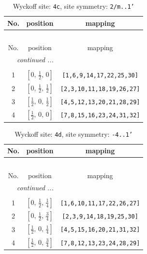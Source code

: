 \documentclass[fleqn,8pt]{jsarticle}
\begin{document}
\renewcommand{\arraystretch}{1.2}
\begin{longtable}{ccc}
\caption{Wyckoff site: {\tt 4c}, site symmetry: {\tt 2/m..1'}}
 \\
 \hline \hline
No. & position & mapping \\ \hline \endfirsthead

\multicolumn{2}{l}{\tablename\ \thetable{}} \\
 \hline \hline
No. & position & mapping \\ \hline \endhead

 \hline \hline
\multicolumn{2}{r}{\footnotesize\it continued ...} \\ \endfoot

 \hline \hline
\multicolumn{2}{r}{} \\ \endlastfoot

1 & $\left[ 0,\, \frac{1}{2},\, 0 \right]$ & {\tt [1,6,9,14,17,22,25,30]} \\ \hline
2 & $\left[ 0,\, \frac{1}{2},\, \frac{1}{2} \right]$ & {\tt [2,3,10,11,18,19,26,27]} \\ \hline
3 & $\left[ \frac{1}{2},\, 0,\, \frac{1}{2} \right]$ & {\tt [4,5,12,13,20,21,28,29]} \\ \hline
4 & $\left[ \frac{1}{2},\, 0,\, 0 \right]$ & {\tt [7,8,15,16,23,24,31,32]} \\
\end{longtable}
\renewcommand{\arraystretch}{1.2}
\begin{longtable}{ccc}
\caption{Wyckoff site: {\tt 4d}, site symmetry: {\tt -4..1'}}
 \\
 \hline \hline
No. & position & mapping \\ \hline \endfirsthead

\multicolumn{2}{l}{\tablename\ \thetable{}} \\
 \hline \hline
No. & position & mapping \\ \hline \endhead

 \hline \hline
\multicolumn{2}{r}{\footnotesize\it continued ...} \\ \endfoot

 \hline \hline
\multicolumn{2}{r}{} \\ \endlastfoot

1 & $\left[ 0,\, \frac{1}{2},\, \frac{1}{4} \right]$ & {\tt [1,6,10,11,17,22,26,27]} \\ \hline
2 & $\left[ 0,\, \frac{1}{2},\, \frac{3}{4} \right]$ & {\tt [2,3,9,14,18,19,25,30]} \\ \hline
3 & $\left[ \frac{1}{2},\, 0,\, \frac{1}{4} \right]$ & {\tt [4,5,15,16,20,21,31,32]} \\ \hline
4 & $\left[ \frac{1}{2},\, 0,\, \frac{3}{4} \right]$ & {\tt [7,8,12,13,23,24,28,29]} \\
\end{longtable}
\end{document}
